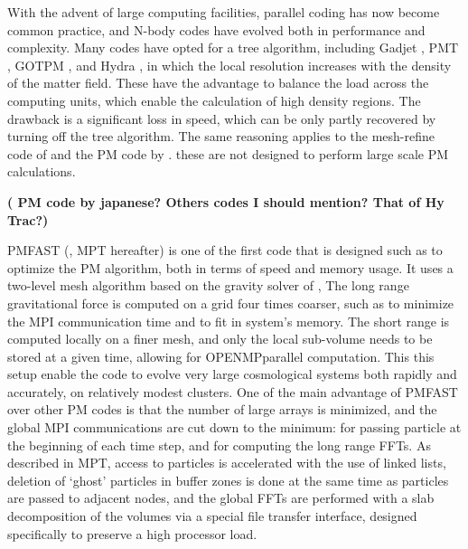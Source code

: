 With the advent of large computing facilities, parallel coding has now become common practice, 
and N-body codes have evolved both in performance and complexity. 
Many codes have opted for a tree algorithm, including Gadjet \citep{Gadjet, Gadjet2}, PMT \citep{1995ApJS...98..355X}, GOTPM \citep{2004NewA....9..111D}, and Hydra \citep{Hydra}, in which the local resolution increases with the density of the matter field. 
These have the advantage to balance the load across the computing units, which enable the calculation of high density regions. 
The drawback is a significant loss in speed, which can be only partly recovered by turning off the tree algorithm. 
The same reasoning applies to the mesh-refine code of  \cite{1991ApJ...368L..23C} and the PM code by \cite{FerrelBertschinger1995}.
 these are not designed to perform large scale PM calculations. 

{\bf ( PM code by japanese? Others codes I should mention? That of Hy Trac?)}


{\small PMFAST} (\cite{2005NewA...10..393M}, MPT hereafter) is one of the first code that is designed such as to optimize the PM algorithm,
both in terms of speed and memory usage. It uses a two-level mesh algorithm based on the gravity solver of \cite{2003AAS...203.9703T},
The long range gravitational force is computed on a  grid four times coarser, such as to minimize the {\small MPI} communication time
and to fit in system's memory. The short range is computed locally on a finer mesh, and only the local sub-volume needs 
to be stored at a given time, allowing for {\small OPENMP}parallel computation.
This this setup enable the code to evolve very large cosmological systems both rapidly and accurately, on relatively modest clusters.
One of the main advantage of {\small PMFAST} over other PM codes is that the number of large arrays is minimized,
and the global {\small MPI} communications are cut down to the minimum: for passing particle at the beginning of each time step,
and  for computing the long range FFTs.
As described in MPT, access to particles is accelerated with the use of linked lists, deletion of `ghost' particles
in buffer zones is done at the same time as particles are passed to adjacent nodes,
and the global FFTs are performed with a slab decomposition of the volumes via a special file transfer interface, 
designed specifically to preserve a high processor load.

